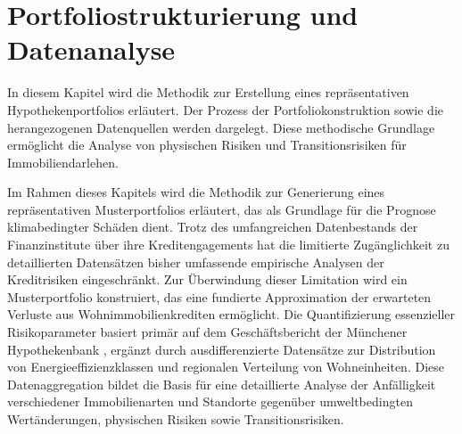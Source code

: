 \section{Portfoliostrukturierung und Datenanalyse}

In diesem Kapitel wird die Methodik zur Erstellung eines repräsentativen Hypothekenportfolios erläutert. Der Prozess der Portfoliokonstruktion sowie die herangezogenen Datenquellen werden dargelegt. Diese methodische Grundlage ermöglicht die Analyse von physischen Risiken und Transitionsrisiken für Immobiliendarlehen.

Im Rahmen dieses Kapitels wird die Methodik zur Generierung eines repräsentativen Musterportfolios erläutert, das als Grundlage für die Prognose klimabedingter Schäden dient. Trotz des umfangreichen Datenbestands der Finanzinstitute über ihre Kreditengagements hat die limitierte Zugänglichkeit zu detaillierten Datensätzen bisher umfassende empirische Analysen der Kreditrisiken eingeschränkt. Zur Überwindung dieser Limitation wird ein Musterportfolio konstruiert, das eine fundierte Approximation der erwarteten Verluste aus Wohnimmobilienkrediten ermöglicht. Die Quantifizierung essenzieller Risikoparameter basiert primär auf dem Geschäftsbericht der Münchener Hypothekenbank \parencite{MuenchenerHyp2023}, ergänzt durch ausdifferenzierte Datensätze zur Distribution von Energieeffizienzklassen und regionalen Verteilung von Wohneinheiten. Diese Datenaggregation bildet die Basis für eine detaillierte Analyse der Anfälligkeit verschiedener Immobilienarten und Standorte gegenüber umweltbedingten Wertänderungen, physischen Risiken sowie Transitionsrisiken.








